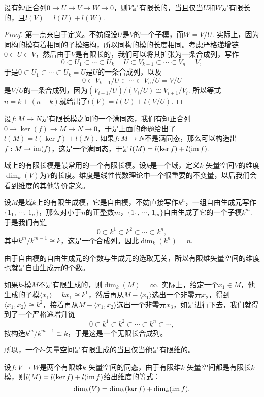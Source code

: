 \begin{pro}
设有短正合列$0\to U\to V\to W\to 0$，则$V$是有限长的，当且仅当$U$和$W$是有限长的，且$l(V)=l(U)+l(W)$.
\end{pro}

\begin{proof}
	第一点来自于定义。不妨假设$U$是$V$的一个子模，而$W=V/U$. 实际上，因为同构的模有着相同的子模结构，所以同构的模的长度相同。考虑严格递增链$0\subset U\subset V$，然后由于$V$是有限长的，我们可以将其扩张为一条合成列，写作
	\[
	0\subset U_1\subset \cdots \subset U_k=U\subset V_{k+1}\subset \cdots \subset V_n=V,
	\]
	于是$0\subset U_1\subset \cdots \subset U_k=U$是$U$的一条合成列，以及
	\[
	0\subset V_{k+1}/U\subset \cdots \subset V_n/U=V/U
	\]
	是$V/U$的一条合成列，因为$(V_{i+1}/U)/(V_{i}/U)\cong V_{i+1}/V_i$. 所以等式$n=k+(n-k)$就给出了$l(V)=l(U)+l(V/U)$.
\end{proof}

设$f:M\to N$是有限长模之间的一个满同态，我们有短正合列$0\to \ker(f)\to M\to N\to 0$，于是上面的命题给出了$l(M)=l(\ker f)+l(N)$. 如果$f:M\to N$不是满同态，那么可以构造出$f:M\to \operatorname{im}(f)$，这是一个满同态，于是$l(M)=l(\ker f)+l(\operatorname{im} f)$. 

\para 域上的有限长模是最常用的一个有限长模。设$k$是一个域，定义$k$-矢量空间$V$的维度$\dim_k(V)$为$V$的长度。维度是线性代数理论中一个很重要的不变量，以后我们会看到维度的其他等价定义。

设$M$是域$k$上的有限生成模，它是自由模，不妨直接写作$k^n$，一组自由生成元写作$\{1_1$, $\cdots$, $1_n\}$，那么对小于$n$的正整数$m$，$\{1_1$, $\cdots$, $1_m\}$自由生成了它的一个子模$k^m$. 于是我们有链
\[
	0\subset k^1\subset  k^2 \subset \cdots \subset k^n,
\]
其中$k^m/k^{m-1}\cong k$，这是一个合成列。因此$\dim_k(k^n)=n$. 

由于自由模的自由生成元的个数与生成元的选取无关，所以有限维矢量空间的维度也就是自由生成元的个数。

如果$k$-模$M$不是有限生成的，则$\dim_k(M)=\infty$. 实际上，给定一个$x_1\in M$，他生成的子模$\langle x_1\rangle=kx_1\cong k^1$，然后再从$M-\langle x_1\rangle$选出一个非零元$x_2$，得到$\langle x_1,x_2\rangle\cong k^2$，接着再从$M-\langle x_1,x_2\rangle$选出一个非零元$x_3$，如是进行下去，我们就得到了一个严格递增升链
\[
	0\subset k^1\subset k^2\subset \cdots \subset k^n\subset \cdots,
\]
按构造$k^m/k^{m-1}\cong k$，于是这是一个无限长合成列。

所以，一个$k$-矢量空间是有限生成的当且仅当他是有限维的。

\begin{pro}[线性代数基本定理]
设$f:V\to W$是两个有限维$k$-矢量空间的同态，由于有限维$k$-矢量空间都是有限长$k$-模，则$l(M)=l(\ker f)+l(\operatorname{im} f)$给出维度的等式：
\[
	\dim_k(V)=\dim_k(\ker f)+\dim_k(\operatorname{im} f).
\]
\end{pro}

